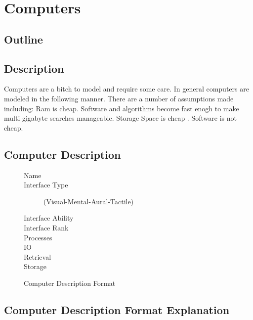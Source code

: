 \chapter{Computers}

\section{Outline}
\section{Description}

Computers are a bitch to model and require some care. In general computers
are modeled in the following manner. There are a number of assumptions made
including: Ram is cheap. Software and algorithms become fast enogh to make
multi gigabyte searches manageable. Storage Space is cheap . Software is not
cheap.

\section{Computer Description}


\begin{figure}[htb]
\caption{Computer Description Format}
	\begin{description}
		\item[Name]
		\item[Interface Type] (Visual-Mental-Aural-Tactile)
		\item[Interface Ability]
        \item[Interface Rank]
		\item[Processes]
		\item[IO]
		\item[Retrieval]
		\item[Storage]
	\end{description}
\end{figure}

\section{Computer Description Format Explanation}

